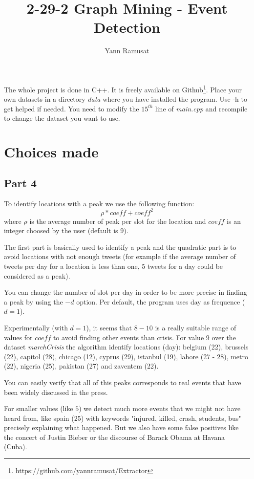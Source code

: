 \documentclass[a4paper]{article}
\title{2-29-2 Graph Mining - Event Detection}
\author{Yann Ramusat}
\begin{document}
\maketitle
The whole project is done in C++. It is freely available on Github\footnote{https://github.com/yannramusat/Extractor}. Place your own datasets in a directory \textit{data} where you have installed the program. Use -h to get helped if needed. 
You need to modify the $15^{th}$ line of \textit{main.cpp} and recompile to change the dataset you want to use.

\tableofcontents

\section{Choices made}
\subsection{Part 4}

 To identify locations with a peak we use the following function:
\[
   \rho*coeff + coeff^2
\]
 where $\rho$ is the average number of peak per slot for the location and $coeff$ is an integer choosed by the user (default is $9$). 
 
 The first part is basically used to identify a peak and the quadratic part is to avoid locations with not enough tweets (for example if the average number of tweets per day for a location is less than one, $5$ tweets for a day could be considered as a peak).
 
 You can change the number of slot per day in order to be more precise in finding a peak by using the $-d$ option. Per default, the program uses day as frequence ($d=1$). 
 
 Experimentally (with $d=1$), it seems that $8-10$ is a really suitable range of values for $coeff$ to avoid finding other events than crisis. For value $9$ over the dataset \textit{marchCrisis} the algorithm identify locations (day): belgium (22), brussels (22), capitol (28), chicago (12), cyprus (29), istanbul (19), lahore (27 - 28), metro (22), nigeria (25), pakistan (27) and zaventem (22).
 
 You can easily verify that all of this peaks corresponds to real events that have been widely discussed in the press.
 
 For smaller values (like $5$) we detect much more events that we might not have heard from, like spain (25) with keywords "injured, killed, crash, students, bus" precisely explaining what happened. But we also have some false positives like the concert of Justin Bieber or the discourse of Barack Obama at Havana (Cuba).
 
\end{document}
